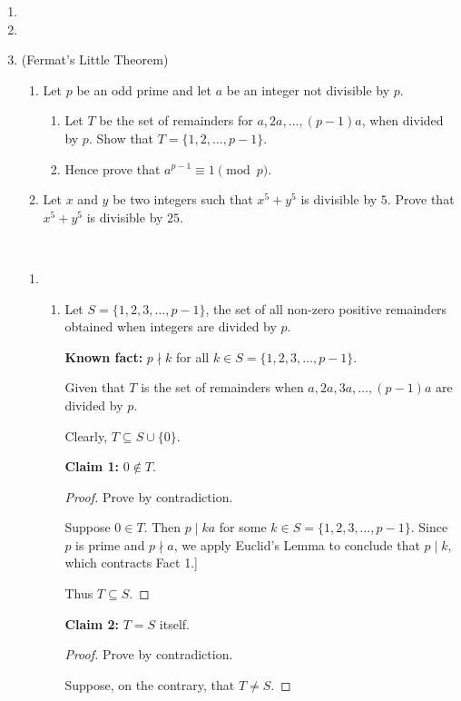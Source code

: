 \begin{enumerate}
\item 
\item 
\item (Fermat's Little Theorem)
\begin{enumerate}[label=(\roman*)]
\item Let $p$ be an odd prime and let $a$ be an integer not divisible by $p$.
    \begin{enumerate}[label=(\alph*)]
    \item Let $T$ be the set of remainders for $a,2a,\dots,(p-1)a$, when divided by $p$. Show that $T=\{1,2,\dots,p-1\}$.
    \item Hence prove that $a^{p-1}\equiv1\pmod p$.
    \end{enumerate}
\item Let $x$ and $y$ be two integers such that $x^5+y^5$ is divisible by $5$. Prove that $x^5+y^5$ is divisible by $25$.
\end{enumerate}

\begin{solution} \
\begin{enumerate}[label=(\roman*)]
\item \begin{enumerate}[label=(\alph*)]
    \item Let $S=\{1,2,3,\dots,p-1\}$, the set of all non-zero positive remainders obtained when integers are divided by $p$.
    
    \textbf{Known fact:} $p\nmid k$ for all $k\in S=\{1,2,3,\dots,p-1\}$.

    Given that $T$ is the set of remainders when $a,2a,3a,\dots,(p-1)a$ are divided by $p$.
    
    Clearly, $T\subseteq S\cup\{0\}$.
    
    \textbf{Claim 1:} $0\notin T$.
    \begin{proof}
    Prove by contradiction.

    Suppose $0\in T$. Then $p\mid ka$ for some $k\in S=\{1,2,3,\dots,p-1\}$. Since $p$ is prime and $p\nmid a$, we apply Euclid’s Lemma to conclude that $p\mid k$, which contracts Fact 1.]
    
    Thus $T\subseteq S$.
    \end{proof}
    
    \textbf{Claim 2:} $T=S$ itself.
    \begin{proof}
    Prove by contradiction. 
    
    Suppose, on the contrary, that $T\neq S$.
    

\end{proof}
\end{enumerate}
\end{enumerate}
\end{solution}
\end{enumerate}
